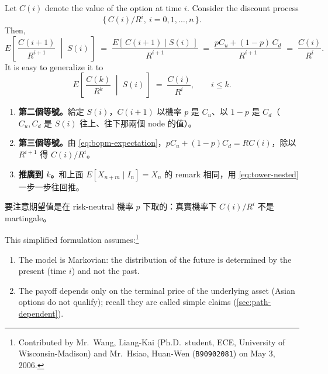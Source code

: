 \suppstart
{}
\suppend


Let $C(i)$ denote the value of the option at time $i$.
Consider the discount process
\[
	\bigl\{\,C(i)/R^{i},\ i=0,1,\dots,n\,\bigr\} .
\]
Then,
\[
	E\left[\,\frac{C(i+1)}{R^{i+1}}\;\middle|\;S(i)\,\right]
	\;=\; \frac{E[\,C(i+1)\mid S(i)\,]}{R^{i+1}}
	\;=\; \frac{pC_{u}+(1-p)\,C_{d}}{R^{i+1}}
	\;=\; \frac{C(i)}{R^{i}} .
\]
It is easy to generalize it to
\[
	E\left[\,\frac{C(k)}{R^{k}}\;\middle|\;S(i)\,\right] \;=\; \frac{C(i)}{R^{i}} , \qquad i\le k .
\]

\suppstart
{}

\begin{remark}
	\begin{enumerate}[(1),nosep]
		\item \textbf{第二個等號。}給定 $S(i)$，$C(i+1)$ 以機率 $p$ 是 $C_{u}$、以 $1-p$ 是 $C_{d}$（$C_{u},C_{d}$ 是 $S(i)$ 往上、往下那兩個 node 的值）。
		\item \textbf{第三個等號。}由 \eqref{eq:bopm-expectation}，$pC_{u}+(1-p)C_{d}=RC(i)$，除以 $R^{i+1}$ 得 $C(i)/R^{i}$。
		\item \textbf{推廣到 $k$。}和上面 $E[X_{n+m}\mid I_{n}]=X_{n}$ 的 remark 相同，用 \eqref{eq:tower-nested} 一步一步往回推。
	\end{enumerate}
	要注意期望值是在 risk-neutral 機率 $p$ 下取的：真實機率下 $C(i)/R^{i}$ 不是 martingale。
\end{remark}
\suppend

This simplified formulation assumes:\footnote{Contributed by Mr.~Wang, Liang-Kai (Ph.D.\ student, ECE, University of Wisconsin-Madison) and Mr.~Hsiao, Huan-Wen (\texttt{B90902081}) on May 3, 2006.}
\begin{enumerate}[(1),nosep]
	\item The model is Markovian: the distribution of the future is determined by the present (time $i$) and not the past.
	\item The payoff depends only on the terminal price of the underlying asset (Asian options do not qualify); recall they are called simple claims (\autoref{sec:path-dependent}).
\end{enumerate}

